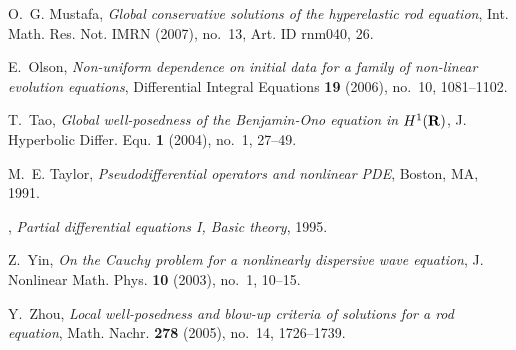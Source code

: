 \documentclass[12pt,reqno]{amsbook}
\numberwithin{section}{chapter}
\numberwithin{equation}{section}  %
\theoremstyle{remark}
\begin{document}
\begin{thebibliography}{HIKK10}
O.~G. Mustafa, \emph{{Global conservative solutions of the hyperelastic rod
  equation}}, Int. Math. Res. Not. IMRN (2007), no.~13, Art. ID rnm040, 26.

E.~Olson, \emph{{Non-uniform dependence on initial data for a family of
  non-linear evolution equations}}, Differential Integral Equations \textbf{19}
  (2006), no.~10, 1081--1102.

T.~Tao, \emph{Global well-posedness of the Benjamin-Ono equation in
  $H^1(\bf R)$}, J. Hyperbolic Differ. Equ. \textbf{1} (2004), no.~1,
  27--49.

M.~E. Taylor, \emph{{Pseudodifferential operators and nonlinear PDE}}, Boston,
  MA, 1991.

\bysame, \emph{{Partial differential equations I, Basic theory}}, 1995.

Z.~Yin, \emph{{On the Cauchy problem for a nonlinearly dispersive wave
  equation}}, J. Nonlinear Math. Phys. \textbf{10} (2003), no.~1, 10--15.

Y.~Zhou, \emph{{Local well-posedness and blow-up criteria of solutions for a
  rod equation}}, Math. Nachr. \textbf{278} (2005), no.~14, 1726--1739.

\end{thebibliography}
%
%
%
%
\end{document}
